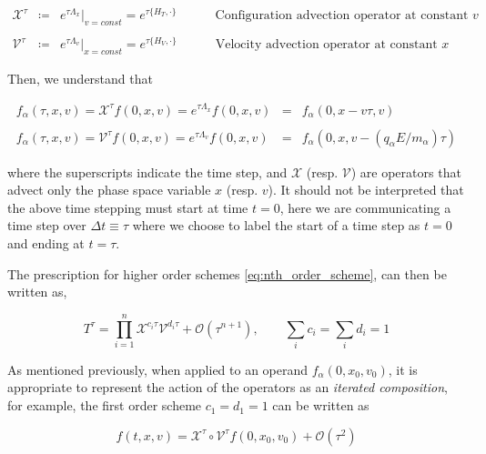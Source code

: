 \documentclass[11pt,titlepage]{report}
\begin{document}
\begin{eqnarray}
\mathcal{X}^{\tau} & \coloneqq  & e^{\tau \Lambda_x}|_{v = const} = e^{\tau \{H_T,\cdot\}} \qquad \quad \textrm{Configuration advection operator at constant $v$}\\
&& \nonumber \\
\mathcal{V}^{\tau} & \coloneqq &  e^{\tau \Lambda_v}|_{x = const} = e^{\tau \{H_V,\cdot\}} \qquad \quad \textrm{Velocity advection operator at constant $x$}
\end{eqnarray}

\noindent Then, we understand that

\begin{eqnarray}
f_{\alpha}(\tau ,x,v) = \mathcal{X}^{\tau} f(0,x,v) = e^{\tau \Lambda_x}f(0,x,v) & = & f_{\alpha}(0,x-v\tau,v) \label{eq:x_advection_on_f} \\
&& \nonumber \\
f_{\alpha}(\tau ,x,v) = \mathcal{V}^{\tau} f(0,x,v) =  e^{\tau \Lambda_v}f(0,x,v) & = & f_{\alpha}(0,x,v - (q_{\alpha}E/m_{\alpha})\tau) \label{eq:v_advection_on_f}
\end{eqnarray}

\noindent where the superscripts indicate the time step, and $\mathcal{X}$ (resp. $\mathcal{V}$) are operators that advect only the phase space variable $x$ (resp. $v$). It should not be interpreted that the above time stepping must start at time $t = 0$, here we are communicating a time step over $\Delta t \equiv \tau$ where we choose to label the start of a time step as $t = 0$ and ending at $t = \tau$.

The prescription for higher order schemes \eqref{eq:nth_order_scheme}, can then be written as,

\begin{equation}T^{\tau} = \prod_{i=1}^n \mathcal{X}^{c_i\tau} \mathcal{V}^{d_i\tau} + \mathcal{O}(\tau^{n+1}),\qquad \sum_i c_i = \sum_i d_i = 1 \label{eq:nth_order_scheme_operators}\end{equation}

\noindent As mentioned previously, when applied to an operand $f_{\alpha}(0,x_0,v_0)$, it is appropriate to represent the action of the operators as an \emph{iterated composition}, for example, the first order scheme $c_1 = d_1 = 1$ can be written as

\begin{equation}f(t,x,v) = \mathcal{X}^{\tau}\circ\mathcal{V}^{\tau}f(0,x_0,v_0) + \mathcal{O}(\tau^2)\label{eq:1st_order_scheme}\end{equation}
\end{document}
